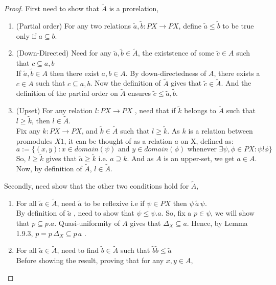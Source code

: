 \documentclass[18pt,a4paper]{article}
\makeatletter
\theoremstyle{definition}
\newcommand{\carrow}{}%
\DeclareRobustCommand{\carrow}{%
	\mathrel{\vphantom{\rightarrow}\mathpalette\circle@arrow\relax}%
}
\newcommand{\circle@arrow}[2]{%
	\m@th
	\ooalign{%
		\hidewidth$#1\circ\mkern1mu$\hidewidth\cr
	$#1\longrightarrow$\cr}%
}
\makeatother
\begin{document}
\begin{proof}
	First need to show that $\tilde{A}$ is a prorelation,
	\begin{enumerate}[label=(\roman*)]
		\item (Partial order) For any two relations $\tilde{a},\tilde{b}:PX \to PX $,
			define $ \tilde{a} \leq \tilde{b}$ to be true only if $a \subseteq b$.
		\item(Down-Directed) Need for any $\tilde{a} ,\tilde{b} \in \tilde{A}$,
			the existstence of some $\tilde{c} \in A$ such that $c \subseteq a,b$\\
			If $\tilde{a} ,\tilde{b} \in A$ then there exist $a,b \in A$. By down-directedness
			of $A$, there exists a $c \in A$ such that  $c \subseteq a,b$. Now the definition
			of $\tilde{A}$ gives that $\tilde{c} \in \tilde{A}$. And the definition of the
		partial order on $\tilde{A}$ ensures $\tilde{c} \leq \tilde{a} ,\tilde{b}$.
		\item (Upset) For any relation $l:PX \to PX$ , need that if  $\tilde{k}$ belongs to
			$\tilde{A}$ such that $l \geq \tilde{k}$, then $l \in \tilde{A}$.\\
			Fix any $k:PX \to PX$, and $\tilde{k} \in \tilde{A}$ such that $l\geq \tilde{k} $.
			As $k$ is a relation between promodules $X \carrow 1$, it can be thought
			of as a relation $a$ on X, defined as:
			\[a:=\{(x,y): x \in domain(\psi) \text{ and }y \in domain(\phi)
			\text{ whenever } \exists \psi,\phi \in PX: \psi l \phi\}\]
			So, $l\geq \tilde{k}$ gives that $\tilde{a}\geq \tilde{k}$ i.e. $a \supseteq k.$
			And as $A$ is an upper-set, we get $a\in A$. Now, by definition of $\tilde{A}$,
			$l \in \tilde{A}$.
	\end{enumerate}
	Secondly, need show that the other two conditions hold for $\tilde{A}$,
	\begin{enumerate}[label=(\roman*)]
		\item For all $\tilde{a} \in \tilde{A}$, need $\tilde{a}$ to be reflexive i.e
			if $\psi \in PX$ then $\psi \, \tilde{a} \, \psi$.\\
			By definition of $\tilde{a}$ , need to show that $\psi \leq \psi.a$.
			So, fix a $p \in \psi$, we will show that $p \subseteq p.a$.
			Quasi-uniformity of $A$ gives that $\Delta_X \subseteq a$. Hence, by Lemma 1.9.3,
			$p=p \, \Delta_X \subseteq p \,a$ .
		\item For all $\tilde{a} \in \tilde{A}$, need to find $\tilde{b}\in \tilde{A}$ such that
			$\tilde{b}\tilde{b} \leq \tilde{a} $\\
			Before showing the result, proving that for any $x,y \in A$,

\end{enumerate}
\end{proof}
\end{document}
